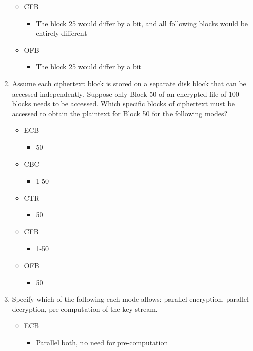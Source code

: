 \documentclass[11pt]{article}
\begin{document}
\begin{enumerate}
\begin{itemize}
\begin{itemize}
\end{itemize}
\item CFB
\begin{itemize}
\item The block 25 would differ by a bit, and all following blocks would be entirely different
\end{itemize}
\item OFB
\begin{itemize}
\item The block 25 would differ by a bit
\end{itemize}
\end{itemize}
\item Assume each ciphertext block is stored on a separate disk block that can be accessed independently. Suppose only Block 50 of an encrypted file of 100 blocks needs to be accessed. Which specific blocks of ciphertext must be accessed to obtain the plaintext for Block 50 for the following modes?
\begin{itemize}
\item ECB
\begin{itemize}
\item 50
\end{itemize}
\item CBC
\begin{itemize}
\item 1-50
\end{itemize}
\item CTR
\begin{itemize}
\item 50
\end{itemize}
\item CFB
\begin{itemize}
\item 1-50
\end{itemize}
\item OFB
\begin{itemize}
\item 50
\end{itemize}
\end{itemize}
\item Specify which of the following each mode allows: parallel encryption, parallel decryption, pre-computation of the key stream.
\begin{itemize}
\item ECB
\begin{itemize}
\item Parallel both, no need for pre-computation
\end{itemize}

\end{itemize}
\end{enumerate}
\end{document}
